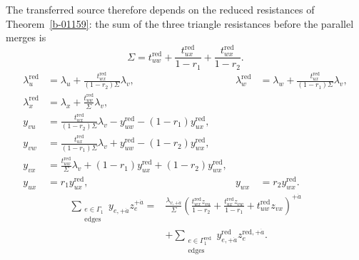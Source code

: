 \documentclass[11pt]{article}
\numberwithin{equation}{section}
\numberwithin{figure}{section}
\numberwithin{table}{section}
\begin{document}
The transferred source therefore depends on the reduced resistances of Theorem~\ref{b-01159}: the sum of the three triangle resistances before the parallel merges is
\begin{equation}\label{local-B-sourced-sigma}
\Sigma=t_{uw}^{\mathrm{red}}+\frac{t_{ux}^{\mathrm{red}}}{1-r_1}+\frac{t_{wx}^{\mathrm{red}}}{1-r_2}.
\end{equation}
\begin{equation}\label{local-B-sourced-current-map}
\begin{aligned}
\lambda_u^{\mathrm{red}}&=\lambda_u+\frac{t_{wx}^{\mathrm{red}}}{(1-r_2)\Sigma}\lambda_v,&
\lambda_w^{\mathrm{red}}&=\lambda_w+\frac{t_{ux}^{\mathrm{red}}}{(1-r_1)\Sigma}\lambda_v,\\
\lambda_x^{\mathrm{red}}&=\lambda_x+\frac{t_{uw}^{\mathrm{red}}}{\Sigma}\lambda_v,\\
y_{vu}&=\frac{t_{wx}^{\mathrm{red}}}{(1-r_2)\Sigma}\lambda_v-y_{uw}^{\mathrm{red}}-(1-r_1)y_{ux}^{\mathrm{red}},\\
y_{vw}&=\frac{t_{ux}^{\mathrm{red}}}{(1-r_1)\Sigma}\lambda_v+y_{uw}^{\mathrm{red}}-(1-r_2)y_{wx}^{\mathrm{red}},\\
y_{vx}&=\frac{t_{uw}^{\mathrm{red}}}{\Sigma}\lambda_v+(1-r_1)y_{ux}^{\mathrm{red}}+(1-r_2)y_{wx}^{\mathrm{red}},\\
y_{ux}&=r_1y_{ux}^{\mathrm{red}},&y_{wx}&=r_2y_{wx}^{\mathrm{red}}.
\end{aligned}
\end{equation}
\begin{equation*}
\begin{aligned}
\sum_{\substack{e\in\Gamma_1\\\mathrm{edges}}}y_{e,+\dot a}z_e^{+\dot a}
={}&\frac{\lambda_{v,+\dot a}}{\Sigma}
\left(\frac{t_{wx}^{\mathrm{red}}z_{vu}}{1-r_2}
+\frac{t_{ux}^{\mathrm{red}}z_{vw}}{1-r_1}
+t_{uw}^{\mathrm{red}}z_{vx}\right)^{+\dot a}\\
&+\sum_{\substack{e\in\Gamma_1^{\mathrm{red}}\\\mathrm{edges}}}
y_{e,+\dot a}^{\mathrm{red}}z_e^{\mathrm{red},+\dot a}.
\end{aligned}
\end{equation*}
\end{document}
